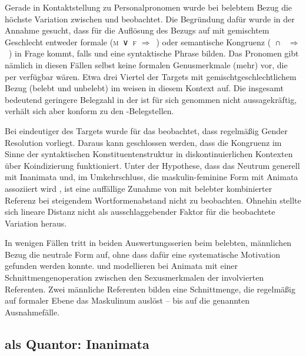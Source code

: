 Gerade in Kontaktstellung zu Personalpronomen wurde bei belebtem Bezug die
höchste Variation zwischen  und  beobachtet. Die
Begründung dafür wurde in der Annahme gesucht, dass für die Auflösung des Bezugs auf  mit gemischtem Geschlecht entweder
formale (\textsc{m}~∨~\textsc{f} $\Rightarrow$~) oder semantische
Kongruenz (\SM{}~∩~\SF{} $\Rightarrow$~) in Frage kommt, falls
 und  eine syntaktische Phrase bilden. Das Pronomen gibt
nämlich in diesen Fällen selbst keine formalen Genus\-merk\-male (mehr) vor,
die per  verfügbar wären. Etwa drei Viertel der Targets mit
gemischtgeschlechtlichem Bezug (belebt und unbelebt) im \CAO{} weisen in diesem
Kontext  auf. Die insgesamt bedeutend geringere
Belegzahl in der \KC{} ist für sich genommen nicht aussagekräftig, verhält sich
aber konform zu den \CAO-Belegstellen.

Bei eindeutiger  des Targets wurde für das \CAO{}
beobachtet, dass regel\-mäßig Gender Re\-solu\-tion vorliegt. Daraus kann
geschlossen werden, dass die Kongruenz im Sinne der syntaktischen
Konstituentenstruktur in diskontinuierlichen Kontexten über Koindizierung
funktioniert. Unter der Hypothese, dass das Neutrum generell mit Inanimata und,
im Umkehrschluss, die maskulin-feminine Form mit Animata assoziiert wird
\autocite[243--245]{askedal1973}, ist eine auffällige Zunahme von 
mit belebter kombinierter Referenz bei steigendem
Wortformenabstand nicht zu beobachten. Ohnehin stellte
sich lineare Distanz nicht als ausschlaggebender Faktor
für die beob\-ach\-tete Variation heraus.

In wenigen Fällen tritt in beiden Auswertungs\-serien beim belebten, männlichen
Bezug die neutrale Form auf, ohne dass dafür eine systematische Motivation
gefunden werden konnte. \citet{wechslerzlatic2003} und \citet{wechsler2009}
modellieren  bei Animata mit einer
Schnittmengenoperation zwischen den Sexusmerkmalen der involvierten Referenten.
Zwei männliche Referenten bilden eine Schnittmenge, die regelmäßig auf formaler
Ebene das Maskulinum auslöst -- bis auf die genannten
Ausnahmefälle.


\subsection{ als Quantor: Inanimata}

